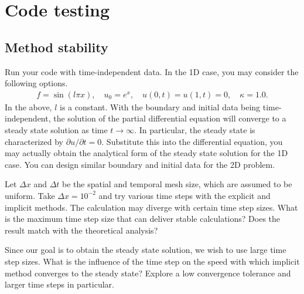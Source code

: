 \documentclass[12pt]{article}
\begin{document}
\section{Code testing}
\subsection{Method stability}
Run your code with time-independent data. In the 1D case, you may consider the following options.
\begin{align*}
f = \sin(l \pi x), \quad u_0 = e^{x}, \quad u(0,t) = u(1,t) = 0, \quad \kappa = 1.0.
\end{align*}
In the above, $l$ is a constant. With the boundary and initial data being time-independent, the solution of the partial differential equation will converge to a steady state solution as time $t \rightarrow \infty$. In particular, the steady state is characterized by $\partial u / \partial t = 0$. Substitute this into the differential equation, you may actually obtain the analytical form of the steady state solution for the 1D case. You can design similar boundary and initial data for the 2D problem.

Let $\Delta x$ and $\Delta t$ be the spatial and temporal mesh size, which are assumed to be uniform. Take $\Delta x = 10^{-2}$ and try various time steps with the explicit and implicit methods. The calculation may diverge with certain time step sizes. What is the maximum time step size that can deliver stable calculations? Does the result match with the theoretical analysis?

Since our goal is to obtain the steady state solution, we wish to use large time step sizes. What is the influence of the time step on the speed with which implicit method converges to the steady state? Explore a low convergence tolerance and larger time steps in particular.
\end{document}
